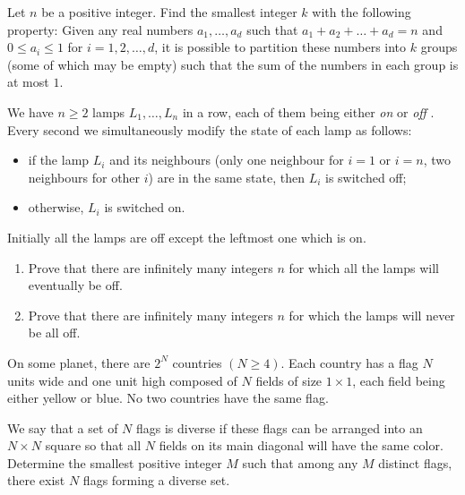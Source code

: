 

%



\renewcommand{\theenumi}{\alph{enumi}}



\noindent
 
\filbreak

\begin{problem}

Let $n$ be a positive integer. Find the smallest integer $k$ with the following property: Given
any real numbers $a_1, \dots , a_d$ such that $a_1 + a_2 + \dots + a_d = n$ and $0 \le a_i \le 1$ for $i = 1, 2, \dots , d$, it
is possible to partition these numbers into $k$ groups (some of which may be empty) such that the
sum of the numbers in each group is at most $1$.

\end{problem}

\begin{problem}

We have $n \ge 2$ lamps $L_1, \dots, L_n$ in a row, each of them being either \textit{on} or \textit{off} . Every
second we simultaneously modify the state of each lamp as follows:
\begin{itemize}
\item if the lamp $L_i$ and its neighbours (only one neighbour for $i = 1$ or $i = n$, two neighbours for
other $i$) are in the same state, then $L_i$
is switched off;
\item otherwise, $L_i$ is switched on.
\end{itemize}

Initially all the lamps are off except the leftmost one which is on.
\begin{enumerate}
\item Prove that there are infinitely many integers $n$ for which all the lamps will eventually
be off.
\item Prove that there are infinitely many integers $n$ for which the lamps will never be all off.
\end{enumerate}


\end{problem}


\begin{problem}
On some planet, there are $2^N$ countries $(N \ge 4)$. Each country has a flag $N$ units wide
and one unit high composed of $N$ fields of size $1\times1$, each field being either yellow or blue. No
two countries have the same flag.

We say that a set of $N$ flags is diverse if these flags can be arranged into an $N \times N$ square so
that all $N$ fields on its main diagonal will have the same color. Determine the smallest positive
integer $M$ such that among any $M$ distinct flags, there exist $N$ flags forming a diverse set.

\end{problem}




